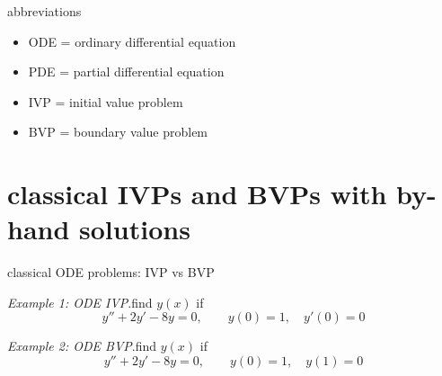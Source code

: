 \documentclass[10pt,hyperref]{beamer}
\date{February 2014}
\begin{document}
\begin{frame}
  \maketitle
\end{frame}


\begin{frame}{abbreviations} 

\begin{itemize}
\item ODE = ordinary differential equation
\item PDE = partial differential equation
\item IVP = initial value problem
\item BVP = boundary value problem
\end{itemize}
\end{frame}



\section[classical IVPs and BVPs]{classical IVPs and BVPs with by-hand solutions}

\begin{frame}{classical ODE problems: IVP vs BVP}

\noindent\emph{Example 1: ODE IVP}.\qquad find $y(x)$ if
  	$$y'' + 2 y' - 8 y = 0, \qquad y(0)=1, \quad y'(0)=0$$
\bigskip

\noindent\emph{Example 2: ODE BVP}.\qquad find $y(x)$ if
  	$$y'' + 2 y' - 8 y = 0, \qquad y(0)=1, \quad y(1)=0$$

\end{frame}
\end{document}
